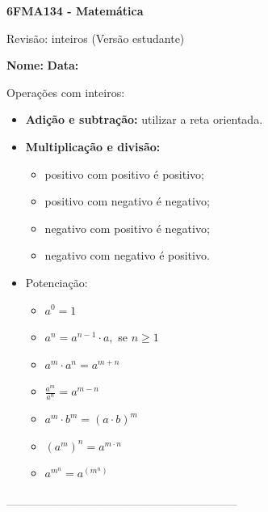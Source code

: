 \documentclass[a4paper,14pt]{article}
\begin{document}
	
	\noindent\textbf{6FMA134 - Matemática} 
	
	\begin{center}Revisão: inteiros (Versão estudante)
	\end{center}
	
	\noindent\textbf{Nome:} \underline{\hspace{10cm}}
	\noindent\textbf{Data:} \underline{\hspace{4cm}}
	
	
	\begin{multicols}{2}
	    \noindent Operações com inteiros:
	    \begin{itemize}
	    	\item \textbf{Adição e subtração:} utilizar a reta orientada.
	    	\item \textbf{Multiplicação e divisão: }
	    	\begin{itemize}[label=\scalebox{0.5}{$\blacksquare$}]
	    		\item positivo com positivo é positivo;
	    		\item positivo com negativo é negativo;
	    		\item negativo com positivo é negativo;
	    		\item negativo com negativo é positivo.
	    	\end{itemize}
	    	\item Potenciação:
	    	\begin{itemize}[label=\scalebox{0.5}{$\blacksquare$}]
	    		\item $a^0 = 1$
	    		\item $a^n = a^{n - 1} \cdot a,$ se $n \geq 1$  
	    		\item $a^m \cdot a^n = a^{m + n}$
	    		\item $\frac{a^m}{a^n} = a^{m - n}$
	    		\item $a^m \cdot b^m = (a \cdot b)^m$
	    		\item $(a^m)^n = a^{m \cdot n}$
	    		\item $a^{m^n} = a^{(m^{n})}$
	    	\end{itemize}
	    \end{itemize}
		\noindent\textsubscript{--------------------------------------------------------------------------}
		\begin{enumerate} 

\end{enumerate}
\end{multicols}
\end{document}

